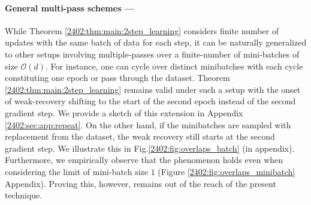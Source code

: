 \paragraph{General multi-pass schemes ---}
\label{2402:sec:main:extensions}
While Theorem \ref{2402:thm:main:2step_learning} considers finite number of updates with the same batch of data for each step, it can be naturally generalized to other setups involving multiple-passes over a finite-number of mini-batches of size $\mathcal{O}(d)$. For instance, one can cycle over distinct minibatches with each cycle constituting one epoch or pass through the dataset. Theorem \ref{2402:thm:main:2step_learning} remains valid under such a setup with the onset of weak-recovery shifting to the start of the second epoch instead of the second gradient step. We provide a sketch of this extension in Appendix \ref{2402:sec:app:repeat}. On the other hand, if the minibatches are sampled with replacement from the dataset, the weak recovery still starts at the second gradient step. We illustrate this in Fig.\ref{2402:fig:overlaps_batch} (in appendix). Furthermore, we empirically observe that the phenomenon holds even when considering the limit of mini-batch size $1$ (Figure \ref{2402:fig:overlaps_minibatch} Appendix). Proving this,  however, 
remains out of the reach of the present technique.
